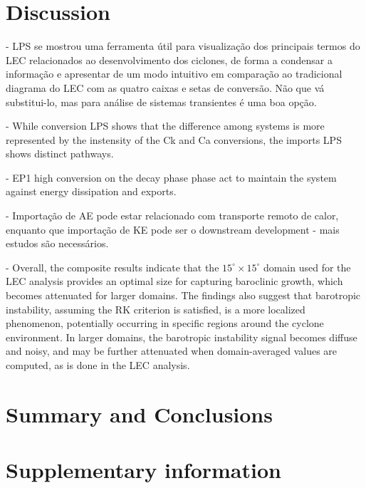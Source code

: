 \documentclass[pdflatex,sn-chicago]{sn-jnl}%
\theoremstyle{plain}
\theoremstyle{definition}
\theoremstyle{remark}
\theoremstyle{definition}
\begin{document}
\section{Discussion}\label{sec:discussion}

- LPS se mostrou uma ferramenta útil para visualização dos principais termos do LEC relacionados ao desenvolvimento dos ciclones, de forma a condensar a informação e apresentar de um modo intuitivo em comparação ao tradicional diagrama do LEC com as quatro caixas e setas de conversão. Não que vá substitui-lo, mas para análise de sistemas transientes é uma boa opção.

-  While conversion LPS shows that the difference among systems is more represented by the instensity of the Ck and Ca conversions, the imports LPS shows distinct pathways.

- EP1 high conversion on the decay phase phase act to maintain the system against energy dissipation \citep{de2025lorenz} and exports.

- Importação de AE pode estar relacionado com transporte remoto de calor, enquanto que importação de KE pode ser o downstream development - mais estudos são necessários.


- Overall, the composite results indicate that the $15^\circ \times 15^\circ$ domain used for the LEC analysis provides an optimal size for capturing baroclinic growth, which becomes attenuated for larger domains. The findings also suggest that barotropic instability, assuming the RK criterion is satisfied, is a more localized phenomenon, potentially occurring in specific regions around the cyclone environment. In larger domains, the barotropic instability signal becomes diffuse and noisy, and may be further attenuated when domain-averaged values are computed, as is done in the LEC analysis.


\section{Summary and Conclusions}\label{sec:conclusion}


\backmatter

\section*{Supplementary information}

\renewcommand{\thefigure}{S\arabic{figure}}
\setcounter{figure}{0}
\end{document}
